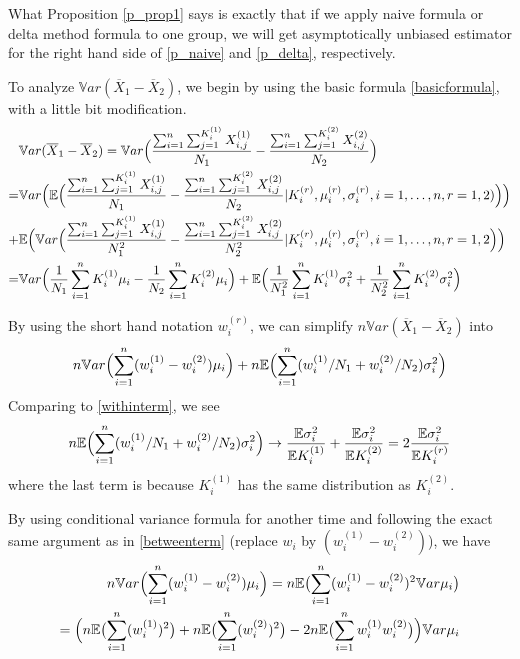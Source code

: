 \documentclass[10pt]{article}
\newcommand{\var}{\ensuremath{\mathbb Var}}
\newcommand{\bbe}{\mathbb{E}}
\newcommand{\xbar}{\overline{X}}
\begin{document}
What Proposition \ref{p_prop1} says is exactly that if we apply naive formula or delta method formula to one group, we will get asymptotically unbiased estimator for the right hand side of \eqref{p_naive} and \eqref{p_delta}, respectively. 

To analyze $\var (\xbar_1-\xbar_2)$, we begin by using the basic formula \eqref{basicformula}, with  a little bit modification. 
\begin{align}
&\var (\xbar_1-\xbar_2) = \var \Bigl( \frac{\sum_{i=1}^n\sum_{j=1}^{K_i^{(1)}} X_{i,j}^{(1)}}{N_1} -\frac{\sum_{i=1}^n\sum_{j=1}^{K_i^{(2)}} X_{i,j}^{(2)}}{N_2}\Bigr) \notag \\
 =& \var \Bigl( \bbe \Bigl( \frac{\sum_{i=1}^n\sum_{j=1}^{K_i^{(1)}} X_{i,j}^{(1)}}{N_1} -\frac{\sum_{i=1}^n\sum_{j=1}^{K_i^{(2)}} X_{i,j}^{(2)}}{N_2}|K_i^{(r)}, \mu_i^{(r)},\sigma_i^{(r)},i=1,\dots,n, r=1,2) \Bigr)\Bigr)\notag \\
+&\bbe \Bigl(\var \Bigl( \frac{\sum_{i=1}^n\sum_{j=1}^{K_i^{(1)}} X_{i,j}^{(1)}}{N_1^2} -\frac{\sum_{i=1}^n\sum_{j=1}^{K_i^{(2)}} X_{i,j}^{(2)}}{N_2^2}|K_i^{(r)}, \mu_i^{(r)},\sigma_i^{(r)},i=1,\dots,n, r=1,2\Bigr)\Bigr) \notag\\
=&\var \Bigl(\frac{1}{N_1}\sum_{i=1}^n K_i^{(1)} \mu_i  - \frac{1}{N_2}\sum_{i=1}^n K_i^{(2)} \mu_i\Bigr)+\bbe \Bigl(\frac{1}{N_1^2}\sum_{i=1}^n K_i^{(1)} \sigma^2_i   + \frac{1}{N_2^2}\sum_{i=1}^n K_i^{(2)} \sigma^2_i \Bigr)  \label{basicformula2}
\end{align}

By using the short hand notation $w_i^{(r)}$, we can simplify $n\var (\xbar_1-\xbar_2)  $ into 
\begin{align}
n\var\Bigl( \sum_{i=1}^n (w_i^{(1)}-w_i^{(2)})\mu_i\Bigr) + n\bbe \Bigl( \sum_{i=1}^n (w_i^{(1)}/N_1+w_i^{(2)}/N_2)\sigma_i^2\Bigr)
\end{align}
Comparing to \eqref{withinterm}, we see
\begin{align}
n\bbe \Bigl( \sum_{i=1}^n (w_i^{(1)}/N_1+w_i^{(2)}/N_2)\sigma_i^2\Bigr) \to \frac{\bbe \sigma_i^2}{\bbe K_i^{(1)}}+ \frac{\bbe \sigma_i^2}{\bbe K_i^{(2)}} = 2 \frac{\bbe \sigma_i^2}{\bbe K_i^{(r)}} \label{p_within}
\end{align}
where the last term is because $K_i^{(1)}$ has the same distribution as $K_i^{(2)}$. 


By using conditional variance formula for another time and following the exact same argument as in \eqref{betweenterm} (replace $w_i$ by $(w_i^{(1)}-w_i^{(2)})$), we have
\begin{align}
n\var\Bigl( \sum_{i=1}^n (w_i^{(1)}-w_i^{(2)})\mu_i\Bigr) = n\bbe \bigl( \sum_{i=1}^n (w_i^{(1)}-w_i^{(2)})^2 \var \mu_i\bigr) \notag \\
= \Bigl( n\bbe \bigl (\sum_{i=1}^n (w_i^{(1)})^2\bigr)+ n\bbe \bigl (\sum_{i=1}^n (w_i^{(2)})^2\bigr)-2 n\bbe\bigl( \sum_{i=1}^n w_i^{(1)}w_i^{(2)}\bigr)\Bigl) \var \mu_i
\end{align}
\end{document}

